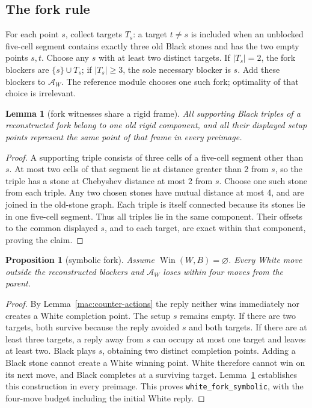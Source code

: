 \documentclass[11pt]{article}
\newtheorem{lemma}[theorem]{Lemma}
\newtheorem{proposition}[theorem]{Proposition}
\theoremstyle{definition}
\theoremstyle{remark}
\newcommand{\Win}{\operatorname{Win}}
\begin{document}
\subsection{The fork rule}

For each point \(s\), collect targets \(T_s\): a target \(t\ne s\) is included when an unblocked five-cell segment contains exactly three old Black stones and has the two empty points \(s,t\). Choose any \(s\) with at least two distinct targets. If \(|T_s|=2\), the fork blockers are \(\{s\}\cup T_s\); if \(|T_s|\ge3\), the sole necessary blocker is \(s\). Add these blockers to \(\mathcal A_W\). The reference module chooses one such fork; optimality of that choice is irrelevant.

\begin{lemma}[fork witnesses share a rigid frame]\label{mac:fork-frame}
All supporting Black triples of a reconstructed fork belong to one old rigid component, and all their displayed setup points represent the same point of that frame in every preimage.

\end{lemma}
\begin{proof}
A supporting triple consists of three cells of a five-cell segment other than \(s\). At most two cells of that segment lie at distance greater than 2 from \(s\), so the triple has a stone at Chebyshev distance at most 2 from \(s\). Choose one such stone from each triple. Any two chosen stones have mutual distance at most 4, and are joined in the old-stone graph. Each triple is itself connected because its stones lie in one five-cell segment. Thus all triples lie in the same component. Their offsets to the common displayed \(s\), and to each target, are exact within that component, proving the claim. 
\end{proof}

\begin{proposition}[symbolic fork]\label{mac:fork}
Assume \(\Win(W,B)=\varnothing\). Every White move outside the reconstructed blockers and \(\mathcal A_W\) loses within four moves from the parent.

\end{proposition}
\begin{proof}
By Lemma~\ref{mac:counter-actions} the reply neither wins immediately nor creates a White completion point. The setup \(s\) remains empty. If there are two targets, both survive because the reply avoided \(s\) and both targets. If there are at least three targets, a reply away from \(s\) can occupy at most one target and leaves at least two. Black plays \(s\), obtaining two distinct completion points. Adding a Black stone cannot create a White winning point. White therefore cannot win on its next move, and Black completes at a surviving target. Lemma~\ref{mac:fork-frame} establishes this construction in every preimage. This proves \texttt{white\_fork\_symbolic}, with the four-move budget including the initial White reply. 
\end{proof}
\end{document}
